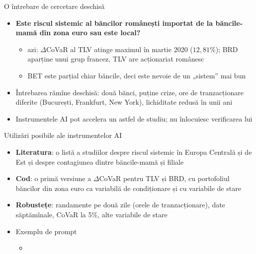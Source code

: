 \begin{frame}{O întrebare de cercetare deschisă}
\itemsize{\small}
\begin{itemize}
    \item \textbf{Este riscul sistemic al băncilor românești importat de la băncile-mamă din zona euro sau este local?}
    \begin{itemize}
        \item azi: $\Delta$CoVaR al TLV atinge maximul în martie 2020 ($12{,}81\%$); BRD aparține unui grup francez, TLV are acționariat românesc
        \item BET este parțial chiar băncile, deci este nevoie de un „sistem” mai bun
    \end{itemize}
    \item Întrebarea rămîne deschisă: două bănci, puține crize, ore de tranzacționare diferite (București, Frankfurt, New York), lichiditate redusă în unii ani
    \item Instrumentele AI pot accelera un astfel de studiu; nu înlocuiesc verificarea lui 
\end{itemize}
\end{frame}

\begin{frame}{Utilizări posibile ale instrumentelor AI}
\itemsize{\small}
\begin{itemize}
    \item \textbf{Literatura}: o listă a studiilor despre riscul sistemic în Europa Centrală și de Est și despre contagiunea dintre băncile-mamă și filiale
    \item \textbf{Cod}: o primă versiune a $\Delta$CoVaR pentru TLV și BRD, cu portofoliul băncilor din zona euro ca variabilă de condiționare și cu variabile de stare
    \item \textbf{Robustețe}: randamente pe două zile (orele de tranzacționare), date săptămînale, CoVaR la 5\%, alte variabile de stare
    \item Exemplu de prompt
    \begin{itemize}
        \item {}
    \end{itemize}
\end{itemize}
\end{frame}

